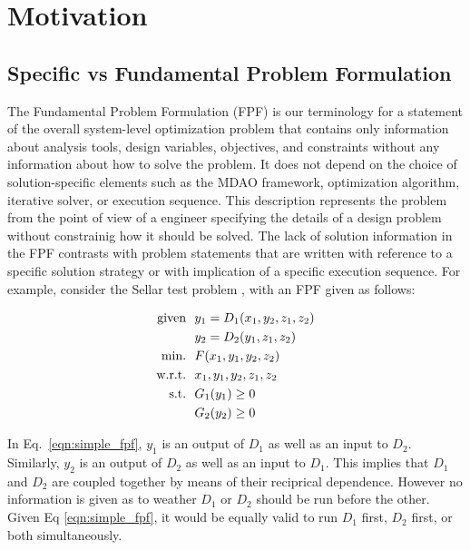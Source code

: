 \section{Motivation}
\subsection{Specific vs Fundamental Problem Formulation }
	\label{s:specific vs fundamental}
    The Fundamental Problem Formulation (FPF) is our terminology for a 
    statement of the overall system-level optimization problem that contains only 
    information about analysis tools, design variables, objectives, and constraints without any 
    information about how to solve the problem. It does not depend on the choice 
    of solution-specific elements such as the MDAO framework, optimization 
    algorithm, iterative solver, or execution sequence. This description represents 
    the problem from the point of view of a engineer specifying the details of a design problem 
    without constrainig how it should be solved. The lack of solution information 
    in the FPF contrasts with problem statements that are written with reference 
    to a specific solution strategy or with implication of a specific execution sequence.
    For example, consider the Sellar test problem \cite{AIAA:sellar}, with an FPF given as follows:

    \begin{align}
        \textrm{given} & \ \ y_1 = D_1(x_1,y_2,z_1,z_2) \notag
        \\      & \ \ y_2 = D_2(y_1,z_1,z_2) \notag
        \\\textrm{min.} &\ \ F(x_1,y_1,y_2,z_2) \notag
        \\\textrm{w.r.t.} & \ \ x_1,y_1,y_2,z_1,z_2 \notag
        \\\textrm{s.t.} & \ \ G_1(y_1) \geq 0 \notag
        \\     & \ \ G_2(y_2) \geq 0
        \label{eqn:simple_fpf}
    \end{align}

    
    In Eq.~\ref{eqn:simple_fpf}, $y_1$ is an output of $D_1$ as well as an input 
    to $D_2$. Similarly, $y_2$ is an output of $D_2$ as well as an input 
    to $D_1$. This implies that $D_1$ and $D_2$ are coupled together by means 
    of their reciprical dependence. However no information is given as to weather
    $D_1$ or $D_2$ should be run before the other. Given Eq \ref{eqn:simple_fpf}, 
    it would be equally valid to run $D_1$ first, $D_2$ first, or both simultaneously. 
    

